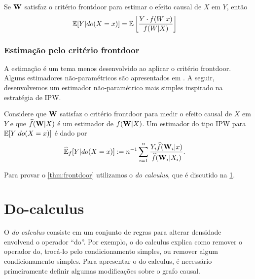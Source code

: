 \begin{theorem}
 \label{thm:frontdoor_ipw}
 Se ${\mathbf{W}}$ satisfaz o critério frontdoor para
 estimar o efeito causal de $X$ em $Y$, então
 \begin{align*}
  {\mathbb E}[Y|do(X=x)]
  &= {\mathbb E}\left[\frac{Y \cdot f(W|x)}{f(W|X)}\right]
 \end{align*}
\end{theorem}

\subsubsection{Estimação pelo critério frontdoor}

A estimação é um tema menos desenvolvido
ao aplicar o critério frontdoor.
Alguns estimadores não-paramétricos
são apresentados em \citet{Tchetgen2012}.
A seguir, desenvolvemos 
um estimador não-paramétrico mais simples 
inspirado na estratégia de IPW.

\begin{definition}
 \label{def:frontdoor_ipw}
 Considere que ${\mathbf{W}}$ satisfaz o critério frontdoor
 para medir o efeito causal de $X$ em $Y$ e que
 $\widehat{f}({\mathbf{W}}|X)$ é um estimador de $f({\mathbf{W}}|X)$.
 Um estimador do tipo IPW para
 ${\mathbb E}[Y|do(X=x)]$ é dado por
 \begin{align*}
  \widehat{{\mathbb E}}_{f}[Y|do(X=x)]
  &:= n^{-1}\sum_{i=1}^n \frac{Y_i \widehat{f}({\mathbf{W}}_i|x)}{\widehat{f}({\mathbf{W}}_i|X_i)}.
 \end{align*}
\end{definition}

Para provar o \cref{thm:frontdoor}
utilizamos o \textit{do calculus}, 
que é discutido na \cref{sec:do_calculus}.

\section{Do-calculus}
\label{sec:do_calculus}

O \textit{do calculus} consiste em 
um conjunto de regras para
alterar densidade envolvend o operador ``do''.
Por exemplo, o do calculus explica 
como remover o operador do,
trocá-lo pelo condicionamento simples, ou
remover algum condicionamento simples.
Para apresentar o do calculus,
é necessário primeiramente definir
algumas modificações sobre o grafo causal.


